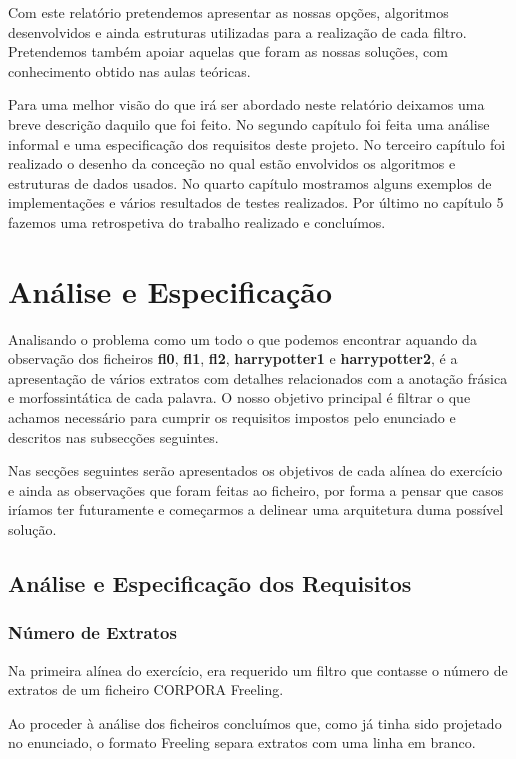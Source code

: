 \documentclass[11pt,a4paper]{report}
\begin{document}
Com este relatório pretendemos apresentar as nossas opções, algoritmos desenvolvidos e ainda estruturas utilizadas para a realização de cada filtro. Pretendemos também apoiar aquelas que foram as nossas soluções, com conhecimento obtido nas aulas teóricas.

Para uma melhor visão do que irá ser abordado neste relatório deixamos uma breve descrição daquilo que foi feito. No segundo capítulo foi feita uma análise informal e uma especificação dos requisitos deste projeto. No terceiro capítulo foi realizado o desenho da conceção no qual estão envolvidos os algoritmos e estruturas de dados usados. No quarto capítulo mostramos alguns exemplos de implementações e vários resultados de testes realizados. Por último no capítulo 5 fazemos uma retrospetiva do trabalho realizado e concluímos.



\chapter{Análise e Especificação}
\label{chap:analise}

Analisando o problema como um todo o que podemos encontrar aquando da observação dos ficheiros \textbf{fl0}, \textbf{fl1}, \textbf{fl2}, \textbf{harrypotter1} e \textbf{harrypotter2}, é a apresentação de vários extratos com detalhes relacionados com a anotação frásica e morfossintática de cada palavra. O nosso objetivo principal é filtrar o que achamos necessário para cumprir os requisitos impostos pelo enunciado e descritos nas subsecções seguintes.

Nas secções seguintes serão apresentados os objetivos de cada alínea do exercício e ainda as observações que foram feitas ao ficheiro, por forma a pensar que casos iríamos ter futuramente e começarmos a delinear uma arquitetura duma possível solução.

\section{Análise e Especificação dos Requisitos}
\subsection{Número de Extratos}
\label{subsec:analise1}

Na primeira alínea do exercício, era requerido um filtro que contasse o número de extratos de um ficheiro CORPORA Freeling.

Ao proceder à análise dos ficheiros concluímos que, como já tinha sido projetado no enunciado, o formato Freeling separa extratos com uma linha em branco.
\end{document}

